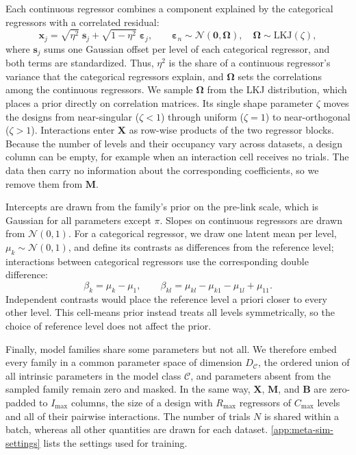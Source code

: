 \documentclass[11pt]{article}
\newcommand{\rmB}{\mathbf{B}}
\newcommand{\rmX}{\mathbf{X}}
\newcommand{\rmM}{\mathbf{M}}
\newcommand{\rmOmega}{\bm{\Omega}}
\providecommand{\autoref}[1]{\ref{#1}}
\begin{document}
Each continuous regressor combines a component explained by the categorical regressors with a correlated residual:
\begin{equation}
\label{eq:continuous-columns}
  \bm{x}_j = \sqrt{\eta^2}\; \bm{s}_j + \sqrt{1 - \eta^2}\; \bm{\varepsilon}_j,
  \qquad
  \bm{\varepsilon}_n \sim \mathcal{N}(\bm{0}, \rmOmega),
  \quad
  \rmOmega \sim \mathrm{LKJ}(\zeta),
\end{equation}
where $\bm{s}_j$ sums one Gaussian offset per level of each categorical regressor, and both terms are standardized. Thus, $\eta^2$ is the share of a continuous regressor's variance that the categorical regressors explain, and $\rmOmega$ sets the correlations among the continuous regressors. We sample $\rmOmega$ from the LKJ distribution, which places a prior directly on correlation matrices. Its single shape parameter $\zeta$ moves the designs from near-singular ($\zeta < 1$) through uniform ($\zeta = 1$) to near-orthogonal ($\zeta > 1$). Interactions enter $\rmX$ as row-wise products of the two regressor blocks. Because the number of levels and their occupancy vary across datasets, a design column can be empty, for example when an interaction cell receives no trials. The data then carry no information about the corresponding coefficients, so we remove them from $\rmM$.

Intercepts are drawn from the family's prior on the pre-link scale, which is Gaussian for all parameters except $\pi$. Slopes on continuous regressors are drawn from $\mathcal{N}(0, 1)$. For a categorical regressor, we draw one latent mean per level, $\mu_k \sim \mathcal{N}(0, 1)$, and define its contrasts as differences from the reference level; interactions between categorical regressors use the corresponding double difference:
\begin{equation}
\label{eq:cell-means}
  \beta_k = \mu_k - \mu_1,
  \qquad
  \beta_{kl} = \mu_{kl} - \mu_{k1} - \mu_{1l} + \mu_{11}.
\end{equation}
Independent contrasts would place the reference level a priori closer to every other level. This cell-means prior instead treats all levels symmetrically, so the choice of reference level does not affect the prior.

Finally, model families share some parameters but not all. We therefore embed every family in a common parameter space of dimension $D_{\mathcal{C}}$, the ordered union of all intrinsic parameters in the model class $\mathcal{C}$, and parameters absent from the sampled family remain zero and masked. In the same way, $\rmX$, $\rmM$, and $\rmB$ are zero-padded to $I_{\max}$ columns, the size of a design with $R_{\max}$ regressors of $C_{\max}$ levels and all of their pairwise interactions. The number of trials $N$ is shared within a batch, whereas all other quantities are drawn for each dataset. \autoref{app:meta-sim-settings} lists the settings used for training.
\end{document}
